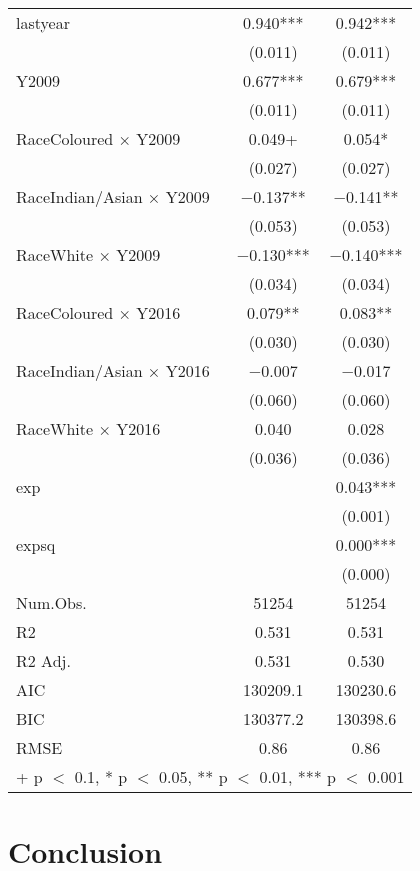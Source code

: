\documentclass[11pt,preprint, authoryear]{elsarticle}
\let\origtable\table
\let\endorigtable\endtable
\renewenvironment{table}[1][2] {
    \expandafter\origtable\expandafter[H]
} {
    \endorigtable
}
\numberwithin{equation}{section}
\numberwithin{figure}{section}
\numberwithin{table}{section}
\begin{document}
\begin{table}
\begin{tabular}[t]{lcc}
lastyear & \num{0.940}*** & \num{0.942}***\\
 & (\num{0.011}) & \vphantom{1} (\num{0.011})\\
Y2009 & \num{0.677}*** & \num{0.679}***\\
 & (\num{0.011}) & (\num{0.011})\\
RaceColoured × Y2009 & \num{0.049}+ & \num{0.054}*\\
 & (\num{0.027}) & (\num{0.027})\\
RaceIndian/Asian × Y2009 & \num{-0.137}** & \num{-0.141}**\\
 & (\num{0.053}) & (\num{0.053})\\
RaceWhite × Y2009 & \num{-0.130}*** & \num{-0.140}***\\
 & (\num{0.034}) & (\num{0.034})\\
RaceColoured × Y2016 & \num{0.079}** & \num{0.083}**\\
 & (\num{0.030}) & (\num{0.030})\\
RaceIndian/Asian × Y2016 & \num{-0.007} & \num{-0.017}\\
 & (\num{0.060}) & (\num{0.060})\\
RaceWhite × Y2016 & \num{0.040} & \num{0.028}\\
 & (\num{0.036}) & (\num{0.036})\\
exp &  & \num{0.043}***\\
 &  & (\num{0.001})\\
expsq &  & \num{0.000}***\\
 &  & (\num{0.000})\\
\midrule
Num.Obs. & \num{51254} & \num{51254}\\
R2 & \num{0.531} & \num{0.531}\\
R2 Adj. & \num{0.531} & \num{0.530}\\
AIC & \num{130209.1} & \num{130230.6}\\
BIC & \num{130377.2} & \num{130398.6}\\
RMSE & \num{0.86} & \num{0.86}\\
\bottomrule
\multicolumn{3}{l}{\rule{0pt}{1em}+ p $<$ 0.1, * p $<$ 0.05, ** p $<$ 0.01, *** p $<$ 0.001}\\
\end{tabular}
\end{table}

\hypertarget{conclusion}{%
\section{Conclusion}\label{conclusion}}
\end{document}
